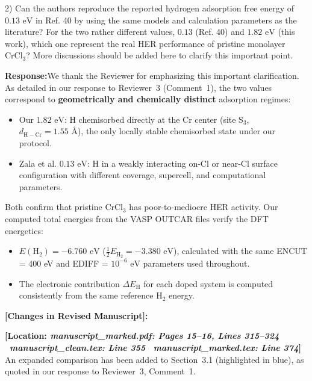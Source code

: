 \documentclass[11pt, sans, a4paper]{moderncv}
\newcommand{\response}{\vspace{0.4em}\noindent\textbf{\color{actionblue}Response:}\hspace{0.5em}}
\newcommand{\manuscriptchange}[1]{\vspace{0.4em}\noindent\textbf{\color{acsblue}[Changes in Revised Manuscript]:}\par\nopagebreak\vspace{0.15em}#1\vspace{0.4em}}
\begin{document}
\vspace{0.8em}

\begin{reviewercomment}
2) Can the authors reproduce the reported hydrogen adsorption free energy of $0.13\text{ eV}$ in Ref. 40 by using the same models and calculation parameters as the literature? For the two rather different values, $0.13$ (Ref. 40) and $1.82\text{ eV}$ (this work), which one represent the real HER performance of pristine monolayer $\text{CrCl}_3$? More discussions should be added here to clarify this important point.
\end{reviewercomment}

\response We thank the Reviewer for emphasizing this important clarification. As detailed in our response to Reviewer~3 (Comment~1), the two values correspond to \textbf{geometrically and chemically distinct} adsorption regimes:
\begin{itemize}[leftmargin=1.5em, itemsep=0.2em]
\item Our $1.82\text{ eV}$: H chemisorbed directly at the Cr center (site S$_3$, $d_{\mathrm{H-Cr}} = 1.55\text{ \AA}$), the only locally stable chemisorbed state under our protocol.
\item Zala et al. $0.13\text{ eV}$: H in a weakly interacting on-Cl or near-Cl surface configuration with different coverage, supercell, and computational parameters.
\end{itemize}
Both confirm that pristine CrCl$_3$ has poor-to-mediocre HER activity. Our computed total energies from the VASP OUTCAR files verify the DFT energetics:
\begin{itemize}[leftmargin=1.5em, itemsep=0.2em]
\item $E(\text{H}_2) = -6.760\text{ eV}$ ($\frac{1}{2}E_{\text{H}_2} = -3.380\text{ eV}$), calculated with the same ENCUT = 400 eV and EDIFF = $10^{-6}\text{ eV}$ parameters used throughout.
\item The electronic contribution $\Delta E_{\mathrm{H}}$ for each doped system is computed consistently from the same reference H$_2$ energy.
\end{itemize}

\manuscriptchange{\textbf{[Location: \textit{manuscript\_marked.pdf: Pages 15--16, Lines 315--324} \textbar\ \textit{manuscript\_clean.tex: Line 355} \textbar\ \textit{manuscript\_marked.tex: Line 374}]}\\ An expanded comparison has been added to Section~3.1 (highlighted in blue), as quoted in our response to Reviewer~3, Comment~1.}
\end{document}
